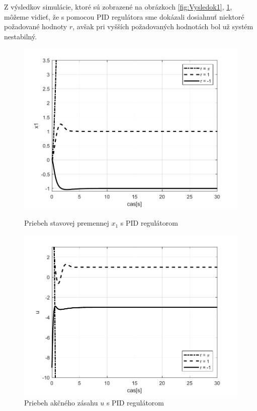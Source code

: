 \documentclass[../main.tex]{subfiles}
\begin{document}
Z výsledkov simulácie, ktoré sú zobrazené na obrázkoch \ref{fig:Vysledok1}, \ref{fig:Vysledok2}, môžeme vidieť, že s pomocou PID regulátora sme dokázali dosiahnuť niektoré požadované hodnoty $r$, avšak pri vyšších požadovaných hodnotách bol už systém nestabilný.
\begin{figure}[!htb]
   \begin{minipage}{0.46\textwidth}
     \centering
     \includegraphics[width=1\linewidth]{xpid.pdf}
     \caption{Priebeh stavovej premennej $x_1$ s PID regulátorom}
	\label{fig:Vysledok1}
   \end{minipage}\hfill
   \begin{minipage}{0.46\textwidth}
     \centering
     \includegraphics[width=1\linewidth]{upid.pdf}
     \caption{Priebeh akčného zásahu $u$ s PID regulátorom}
	\label{fig:Vysledok2}
   \end{minipage}
\end{figure}
\end{document}
